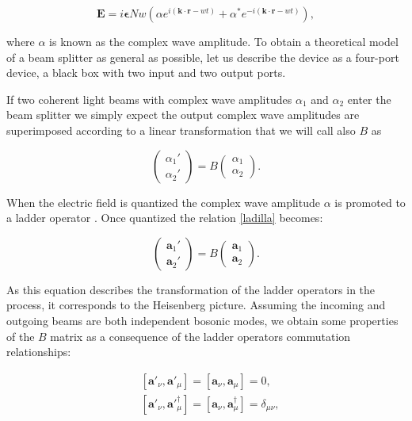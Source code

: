 \documentclass[12pt]{book}
\begin{document}
\begin{equation}
\mathbf{E}=i \mathbf{\epsilon}N w \left( \alpha e^{i (\mathbf{k \cdot r}-w t)}+\alpha^{*} e^{-i (\mathbf{k \cdot r}-w t)} \right),
\end{equation}

where $\alpha$ is known as the complex wave amplitude. To obtain a theoretical model of a beam splitter as general as possible, let us describe the device as a four-port device, a black box with two input and two output ports.

If two coherent light beams with complex wave amplitudes $\alpha_{1}$ and $\alpha_{2}$ enter the beam splitter we simply expect the output complex wave amplitudes  are superimposed according to a linear transformation that we will call also $B$ as

\begin{equation}
\begin{pmatrix} \alpha_{1}' \\ \alpha_{2}' \end{pmatrix}=B\begin{pmatrix} \alpha_{1} \\ \alpha_{2} \end{pmatrix}. \label{ladilla}
\end{equation}

When the electric field  is quantized the complex wave amplitude $\alpha$ is promoted to a ladder operator \cite{ludon}. Once quantized the relation \ref{ladilla} becomes:

\begin{equation}
\begin{pmatrix} \mathbf{a}_{1}' \\ \mathbf{a}_{2}' \end{pmatrix}=B\begin{pmatrix} \mathbf{a}_{1} \\ \mathbf{a}_{2} \end{pmatrix}.
\label{eq:amplitudes}
\end{equation}

As this equation describes the transformation of the ladder operators in the process, it corresponds to the Heisenberg picture. Assuming the incoming and outgoing beams are both independent bosonic modes, we obtain some properties of the $B$ matrix as a consequence of the ladder operators commutation relationships:

\begin{align}
&[\mathbf{a}'_{\nu},\mathbf{a}'_{\mu}]=[\mathbf{a}_{\nu},\mathbf{a}_{\mu}]=0,\\
&[\mathbf{a}'_{\nu},\mathbf{a}'^{\dagger}_{\mu}]=[\mathbf{a}_{\nu},\mathbf{a}^{\dagger}_{\mu}]=\delta_{\mu \nu},
\label{commutators}
\end{align}
\end{document}
